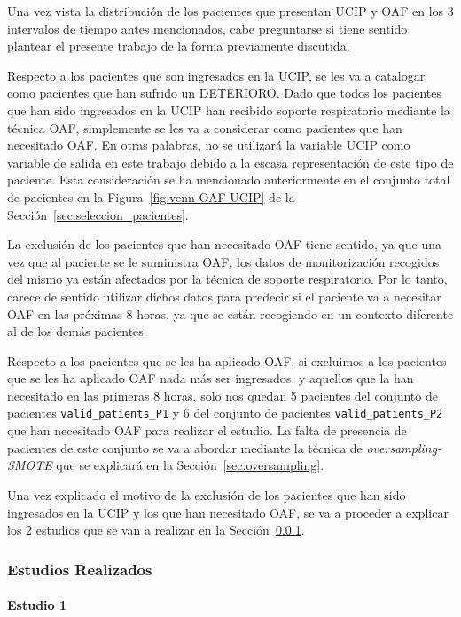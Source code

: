 Una vez vista la distribución de los pacientes que presentan UCIP y OAF en los $3$ intervalos de tiempo antes mencionados, cabe preguntarse si tiene sentido plantear el presente trabajo de la forma previamente discutida.

Respecto a los pacientes que son ingresados en la UCIP, se les va a catalogar como pacientes que han sufrido un DETERIORO. Dado que todos los pacientes que han sido ingresados en la UCIP han recibido soporte respiratorio mediante la técnica OAF, simplemente se les va a considerar como pacientes que han necesitado OAF. En otras palabras, no se utilizará la variable UCIP como variable de salida en este trabajo debido a la escasa representación de este tipo de paciente. Esta consideración se ha mencionado anteriormente en el conjunto total de pacientes en la Figura~\ref{fig:venn-OAF-UCIP} de la Sección~\ref{sec:seleccion_pacientes}.

La exclusión de los pacientes que han necesitado OAF tiene sentido, ya que una vez que al paciente se le suministra OAF, los datos de monitorización recogidos del mismo ya están afectados por la técnica de soporte respiratorio. Por lo tanto, carece de sentido utilizar dichos datos para predecir si el paciente va a necesitar OAF en las próximas $8$ horas, ya que se están recogiendo en un contexto diferente al de los demás pacientes.

Respecto a los pacientes que se les ha aplicado OAF, si excluimos a los pacientes que se les ha aplicado OAF nada más ser ingresados, y aquellos que la han necesitado en las primeras $8$ horas, solo nos quedan 5 pacientes del conjunto de pacientes \texttt{valid\_patients\_P1} y 6 del conjunto de pacientes \texttt{valid\_patients\_P2} que han necesitado OAF para realizar el estudio. La falta de presencia de pacientes de este conjunto se va a abordar mediante la técnica de \textit{oversampling-SMOTE} que se explicará en la Sección~\ref{sec:oversampling}.

Una vez explicado el motivo de la exclusión de los pacientes que han sido ingresados en la UCIP y los que han necesitado OAF, se va a proceder a explicar los $2$ estudios que se van a realizar en la Sección~\ref{sec:estudios}.

\subsubsection{Estudios Realizados}\label{sec:estudios}

\paragraph{Estudio 1}\label{sec:estudio1}

